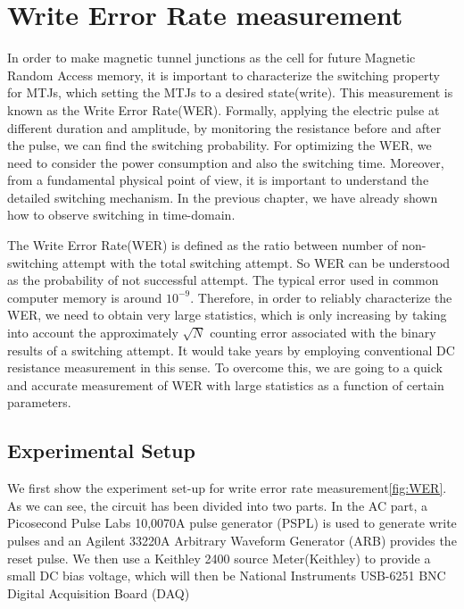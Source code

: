 \chapter{Write Error Rate measurement}

In order to make magnetic tunnel junctions as the cell for future Magnetic Random Access memory, it is important to characterize the switching property for MTJs, which setting the MTJs to a desired state(write). This measurement is known as the Write Error Rate(WER). Formally, applying the electric pulse at different duration and amplitude, by monitoring the resistance before and after the pulse, we can find the switching probability. For optimizing the WER, we need to consider the power consumption and also the switching time. Moreover, from a fundamental physical point of view, it is important to understand the detailed switching mechanism. In the previous chapter, we have already shown how to observe switching in time-domain. 

The Write Error Rate(WER) is defined as the ratio between number of non-switching attempt with the total switching attempt. So WER can be understood as the probability of not successful attempt. The typical error used in common computer memory is around $10^{-9}$. Therefore, in order to reliably characterize the WER, we need to obtain very large statistics, which is only increasing by taking into account the approximately $\sqrt{N}$ counting error associated with the binary results of a switching attempt. It would take years by employing conventional DC resistance measurement in this sense. To overcome this, we are going to a quick and accurate measurement of WER with large statistics as a function of certain parameters.

\section{Experimental Setup}

We first show the experiment set-up for write error rate measurement\ref{fig:WER}. As we can see, the circuit has been divided into two parts. In the AC part, a Picosecond Pulse Labs 10,0070A pulse generator (PSPL) is used to generate write pulses and an Agilent 33220A Arbitrary Waveform Generator (ARB) provides the reset pulse. We then use a Keithley 2400 source Meter(Keithley) to provide a small DC bias voltage, which will then be National Instruments USB-6251 BNC Digital Acquisition Board (DAQ)

